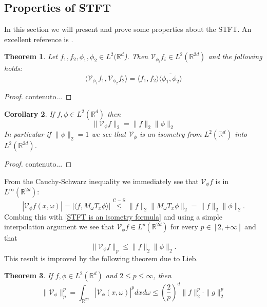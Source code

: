 \documentclass[corpo=11pt, stile=classica, tipotesi=custom,
greek, evenboxes, english]{toptesi}
\numberwithin{equation}{chapter}
\newtheorem{teo}{Theorem}[chapter] %
\newtheorem{cor}[teo]{Corollary}
\theoremstyle{remark}
\newcommand{\R}{\mathbb{R}} %
\newcommand{\V}{\mathcal{V}} %
\begin{document}
\subsection{Properties of STFT}\label{properties of STFT subsection}
In this section we will present and prove some properties about the STFT. An excellent reference is \cite{grochenig}.
\begin{teo}\label{orthogonality relations theorem}
	Let $f_1,f_2,\phi_1,\phi_2 \in L^2(\R^d$). Then $\V_{\phi_i}f_i \in L^2(\R^{2d})$ and the following holds:
	\begin{equation}\label{orthogonality relation formula}
		\langle \V_{\phi_1} f_1, \V_{\phi_2} f_2 \rangle = \langle f_1, f_2 \rangle \overline{\langle \phi_1, \phi_2 \rangle}
	\end{equation}
\end{teo}
\begin{proof}
	contenuto...
\end{proof}
\begin{cor}
	If $f, \phi \in L^2(\R^d)$ then
	\begin{equation}\label{STFT is an isometry formula}
		\| \V_{\phi} f\|_2 = \| f \|_2 \| \phi \|_2
	\end{equation} 
	In particular if $\| \phi \|_2 = 1$ we see that $\V_{\phi}$ is an isometry from $L^2(\R^d)$ into $L^2(\R^{2d})$.
\end{cor}
\begin{proof}
	contenuto...
\end{proof}
From the Cauchy-Schwarz inequality we immediately see that $\V_{\phi} f$ is in $L^{\infty}(\R^{2d})$:
\begin{equation}\label{STFT is bounded}
	|\V_{\phi} f(x,\omega)| = |\langle f, M_{\omega} T_x \phi\rangle| \overset{\mathrm{C-S}}{\leq} \|f\|_2 \|M_{\omega}T_x \phi\|_2 = \|f\|_2 \|\phi\|_2.
\end{equation}
Combing this with \eqref{STFT is an isometry formula} and using a simple interpolation argument we see that $\V_{\phi}f \in L^p(\R^{2d})$ for every $p \in [2,+\infty]$ and that 
\begin{equation}\label{STFT is in L^p for p>=2}
	\|\V_{\phi}f\|_p \leq \|f\|_2 \|\phi\|_2.
\end{equation}
This result is improved by the following theorem due to Lieb.
\begin{teo}\label{Lieb's inequality}
	If $f,\phi \in L^2(\R^d)$ and $2 \leq p \leq \infty$, then
	\begin{equation}\label{Lieb's inequality formula}
		\| \V_{\phi} \|_p^p = \int_{\R^{2d}} |\V_{\phi}(x,\omega)|^p dxd\omega \leq \left(\dfrac{2}{p}\right)^d \|f\|_2^p \cdot \|g\|_2^p
	\end{equation}
\end{teo}
\end{document}
